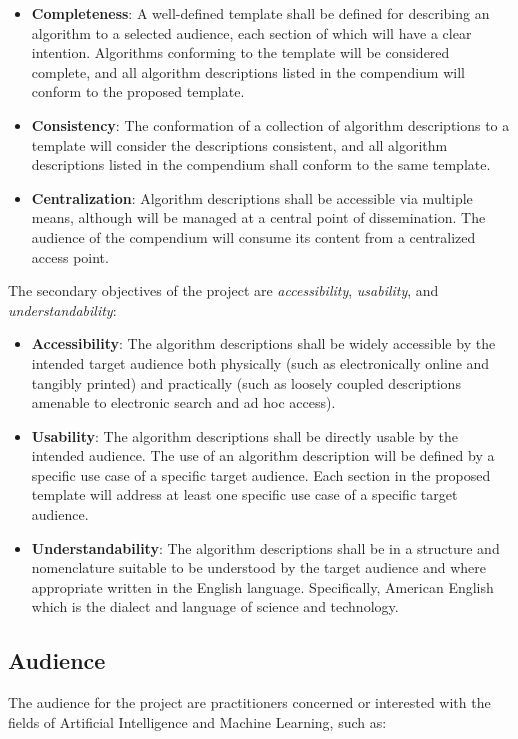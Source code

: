 \documentclass[a4paper, 11pt]{article}
\begin{document}
\begin{itemize}
	\item \textbf{Completeness}: A well-defined template shall be defined for describing an algorithm to a selected audience, each section of which will have a clear intention. Algorithms conforming to the template will be considered complete, and all algorithm descriptions listed in the compendium will conform to the proposed template.
	\item \textbf{Consistency}: The conformation of a collection of algorithm descriptions to a template will consider the descriptions consistent, and all algorithm descriptions listed in the compendium shall conform to the same template.
	\item \textbf{Centralization}: Algorithm descriptions shall be accessible via multiple means, although will be managed at a central point of dissemination. The audience of the compendium will consume its content from a centralized access point.
\end{itemize}

The secondary objectives of the project are \emph{accessibility}, \emph{usability}, and \emph{understandability}:

\begin{itemize}
	\item \textbf{Accessibility}: The algorithm descriptions shall be widely accessible by the intended target audience both physically (such as electronically online and tangibly printed) and practically (such as loosely coupled descriptions amenable to electronic search and ad hoc access).
	\item \textbf{Usability}: The algorithm descriptions shall be directly usable by the intended audience. The use of an algorithm description will be defined by a specific use case of a specific target audience. Each section in the proposed template will address at least one specific use case of a specific target audience.
	\item \textbf{Understandability}: The algorithm descriptions shall be in a structure and nomenclature suitable to be understood by the target audience and where appropriate written in the English language. Specifically, American English which is the dialect and language of science and technology.
\end{itemize}

\subsection{Audience}
The audience for the project are practitioners concerned or interested with the fields of Artificial Intelligence and Machine Learning, such as:
\end{document}

